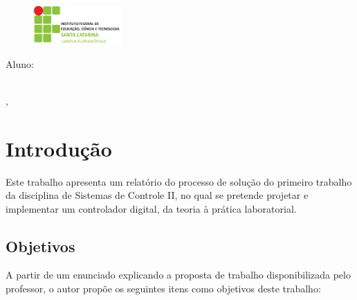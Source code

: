 \documentclass[
	12pt,				%
	article,			%
	openright,			%
	oneside,
	a4paper,			%
	chapter=TITLE,		%
	section=TITLE,		%
	english,			%
	french,				%
	spanish,			%
	brazil,				%
]{abntex2}
\renewcommand{\imprimircapa}{
	\begin{capa}
		\SingleSpacing
		\begin{adjustwidth}{}{}			
			\begin{minipage}{1\textwidth}
				\begin{figure}
					\vspace*{-1em}\includegraphics[height=4em]{logotipo_ifsc.jpg}
				\end{figure}
				\imprimirinstituicao 
			\end{minipage}
			\vfill
			\begin{center}\ABNTEXchapterfont\LARGE\imprimirtitulo
				\vfill
				\small
				\begin{center}
					Aluno: \imprimirautor\\[1em]
					\imprimirorientadorRotulo\imprimirorientador\\
					\imprimircoorientadorRotulo\imprimircoorientador
				\end{center}
				\vfill
				\imprimirlocal, \imprimirdata
			\end{center}	
		\end{adjustwidth}
	\end{capa}
}
\begin{document}
	
	
	\frenchspacing 
	
	
	\imprimircapa
	
	\tableofcontents*
	
	\clearpage
	\listoffigures
	\vspace{34pt}
	\listoftables
	
	\textual
	
	\pagebreak
	
	\chapter*[Introdução]{Introdução}
	
    Este trabalho apresenta um relatório do processo de solução do primeiro trabalho da disciplina de Sistemas de Controle II, no qual se pretende projetar e implementar um controlador digital, da teoria à prática laboratorial.
	
	\section[Objetivos]{Objetivos}
	
	A partir de um enunciado explicando a proposta de trabalho disponibilizada pelo professor, o autor propõe os seguintes itens como objetivos deste trabalho:
	
\end{document}
